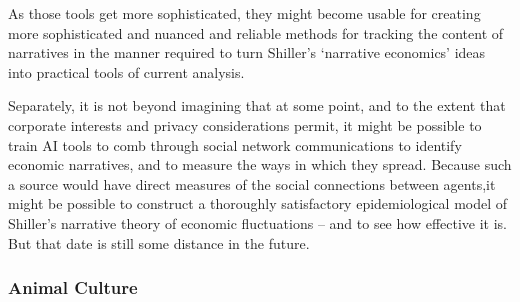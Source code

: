 As those tools get more sophisticated, they might become usable for creating more sophisticated and nuanced and reliable methods for tracking the content of narratives in the manner required to turn Shiller's `narrative economics' ideas into practical tools of current analysis.

Separately, it is not beyond imagining that at some point, and to the extent that corporate interests and privacy considerations permit, it might be possible to train AI tools to comb through social network communications to identify economic narratives, and to measure the ways in which they spread.  Because such a source would have direct measures of the social connections between agents,it might be possible to construct a thoroughly satisfactory epidemiological model of Shiller's narrative theory of economic fluctuations -- and to see how effective it is.  But that date is still some distance in the future.




\subsubsection{Animal Culture}

